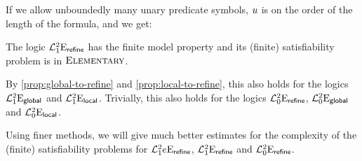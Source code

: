 If we allow unboundedly many unary predicate symbols, $u$ is on the order of
the length of the formula, and we get:
\begin{proposition}
The logic $\mathcal{L}^{2}_{1}{{}}\mathrm{E}_{\mathsf{refine}}$ has the finite model property and its
(finite) satisfiability problem is in $\text{\normalfont{\scshape Elementary}}$.

By \cref{prop:global-to-refine} and \cref{prop:local-to-refine},
this also holds for the logics $\mathcal{L}^{2}_{1}{{}}\mathrm{E}_{\mathsf{global}}$
and $\mathcal{L}^{2}_{1}{{}}\mathrm{E}_{\mathsf{local}}$.
Trivially, this also holds for the logics $\mathcal{L}^{2}_{0}{{}}\mathrm{E}_{\mathsf{refine}}$,
$\mathcal{L}^{2}_{0}{{}}\mathrm{E}_{\mathsf{global}}$ and $\mathcal{L}^{2}_{0}{{}}\mathrm{E}_{\mathsf{local}}$.
\end{proposition}

Using finer methods, we will give much better estimates for the complexity of
the (finite) satisfiability problems for $\mathcal{L}^{2}_{1}{e}\mathrm{E}_{\mathsf{refine}}$,
$\mathcal{L}^{2}_{1}{{}}\mathrm{E}_{\mathsf{refine}}$ and $\mathcal{L}^{2}_{0}{{}}\mathrm{E}_{\mathsf{refine}}$.